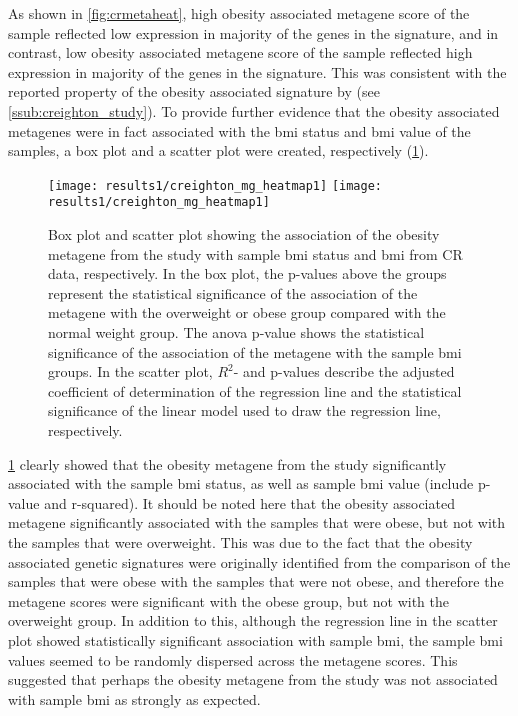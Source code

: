 As shown in \cref{fig:crmetaheat}, high obesity associated metagene score of the sample reflected low expression in majority of the genes in the signature, and in contrast, low obesity associated metagene score of the sample reflected high expression in majority of the genes in the signature.
This was consistent with the reported property of the obesity associated signature by \citet{Creighton2012} (see \cref{ssub:creighton_study}).
To provide further evidence that the obesity associated metagenes were in fact associated with the \gls{bmi} status and \gls{bmi} value of the samples, a box plot and a scatter plot were created, respectively (\cref{fig:crmetaboxplot}).

\begin{figure}[htp!]
	\centering
	\texttt{[image: results1/creighton\_mg\_heatmap1]}
	\hfill
	\texttt{[image: results1/creighton\_mg\_heatmap1]}
	\caption[Obesity metagene from the \citet{Creighton2012} study and sample \gls{bmi}/\gls{bmi} status in CR data]{Box plot and scatter plot showing the association of the obesity metagene from the \citet{Creighton2012} study with sample \gls{bmi} status and \gls{bmi} from CR data, respectively.
	In the box plot, the p-values above the groups represent the statistical significance of the association of the metagene with the overweight or obese group compared with the normal weight group.
	The \gls{anova} p-value shows the statistical significance of the association of the metagene with the sample \gls{bmi} groups.
	In the scatter plot, $R^2$- and p-values describe the adjusted coefficient of determination of the regression line and the statistical significance of the linear model used to draw the regression line, respectively.}
	\label{fig:crmetaboxplot}
\end{figure}

\cref{fig:crmetaboxplot} clearly showed that the obesity metagene from the \citet{Creighton2012} study significantly associated with the sample \gls{bmi} status, as well as sample \gls{bmi} value (include p-value and r-squared).
It should be noted here that the obesity associated metagene significantly associated with the samples that were obese, but not with the samples that were overweight.
This was due to the fact that the obesity associated genetic signatures were originally identified from the comparison of the samples that were obese with the samples that were not obese, and therefore the metagene scores were significant with the obese group, but not with the overweight group.
In addition to this, although the regression line in the scatter plot showed statistically significant association with sample \gls{bmi}, the sample \gls{bmi} values seemed to be randomly dispersed across the metagene scores.
This suggested that perhaps the obesity metagene from the \citet{Creighton2012} study was not associated with sample \gls{bmi} as strongly as expected.
\\


